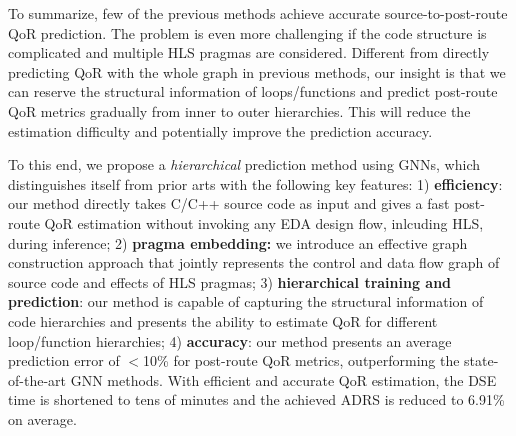 \documentclass[conference]{IEEEtran}
\begin{document}

To summarize, few of the previous methods achieve accurate source-to-post-route QoR prediction. The problem is even more challenging if the code structure is complicated and multiple HLS pragmas are considered. Different from directly predicting QoR with the whole graph in previous methods, our insight is that we can reserve the structural information of loops/functions and predict post-route QoR metrics gradually from inner to outer hierarchies. This will reduce the estimation difficulty and potentially improve the prediction accuracy. 

To this end, we propose a \textit{hierarchical} prediction method using GNNs, which distinguishes itself from prior arts with the following key features: 1) \textbf{efficiency}: our method directly takes C/C++ source code as input and gives a fast post-route QoR estimation without invoking any EDA design flow, inlcuding HLS, during inference; 2) \textbf{pragma embedding:} we introduce an effective graph construction approach that jointly represents the control and data flow graph of source code and effects of HLS pragmas; 3) \textbf{hierarchical training and prediction}: our method is capable of capturing the structural information of code hierarchies and presents the ability to estimate QoR for different loop/function hierarchies; 4) \textbf{accuracy}: our method presents an average prediction error of $<$10\% for post-route QoR metrics, outperforming the state-of-the-art GNN methods. With efficient and accurate QoR estimation, the DSE time is shortened to tens of minutes and the achieved ADRS is reduced to 6.91\% on average.
\end{document}
